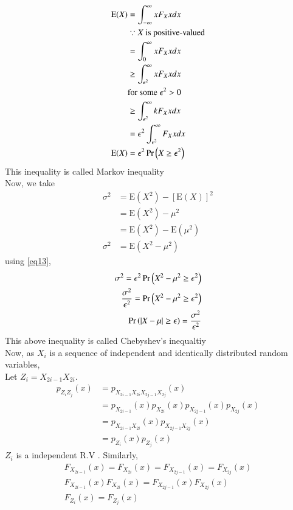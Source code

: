 \documentclass[journal,12pt,Twocolumn]{IEEEtran}
\theoremstyle{remark}
\begin{document}
\begin{align}
\text{E}(X)&=\int_{-\infty}^\infty xF_X{x}dx \\
&\because X \text{ is positive-valued} \\
&=\int_{0}^\infty xF_X{x}dx \\ 
&\geq \int_{\epsilon^2}^\infty xF_X{x}dx \\ 
&\text{for some } \epsilon^2 > 0 \\
&\geq \int_{\epsilon^2}^\infty kF_X{x}dx \\
&=\epsilon^2\int_{\epsilon^2}^\infty F_X{x}dx \\
\label{eq13}\text{E}(X)&=\epsilon^2\Pr\left(X\geq \epsilon^2\right) 
\end{align}
This inequality is called Markov inequality \\
Now, we take 
\begin{align}
\sigma^2 &= \text{E}(X^2) - [\text{E}(X)]^2 \\
&= \text{E}(X^2) - \mu^2 \\
&= \text{E}(X^2) - \text{E}(\mu^2) \\
\sigma^2 &= \text{E}(X^2-\mu^2)
\end{align}
using \eqref{eq13},
\begin{align}
\sigma^2 = \epsilon^2\Pr\left(X^2-\mu^2\geq \epsilon^2\right) \\
\frac{\sigma^2}{\epsilon^2} = \Pr\left(X^2-\mu^2\geq \epsilon^2\right) \\
\Pr\left(|X-\mu|\geq \epsilon\right) = \frac{\sigma^2}{\epsilon^2} 
\end{align}
This above inequality is called Chebyshev's inequaltiy \\
Now, as $X_i$ is a sequence of independent and identically distributed random variables, \\
Let $Z_i = X_{2i-1}X_{2i}$. \\ 
\begin{align}
p_{Z_iZ_j}(x)&=p_{X_{2i-1}X_{2i}X_{2j-1}X_{2j}}(x) \\ 
&= p_{X_{2i-1}}(x)p_{X_{2i}}(x)p_{X_{2j-1}}(x)p_{X_{2j}}(x) \\
&= p_{X_{2i-1}X_{2i}}(x)p_{X_{2j-1}X_{2j}}(x) \\
&= p_{Z_i}(x)p_{Z_j}(x)
\end{align}
$Z_i$ is a independent R.V . Similarly,
\begin{align}
F_{X_{2i-1}}(x) = F_{X_{2i}}(x) = F_{X_{2j-1}}(x) = F_{X_{2j}}(x) \\
F_{X_{2i-1}}(x)F_{X_{2i}}(x) = F_{X_{2j-1}}(x)F_{X_{2j}}(x) \\
F_{Z_i}(x) = F_{Z_j}(x)
\end{align}
\end{document}
